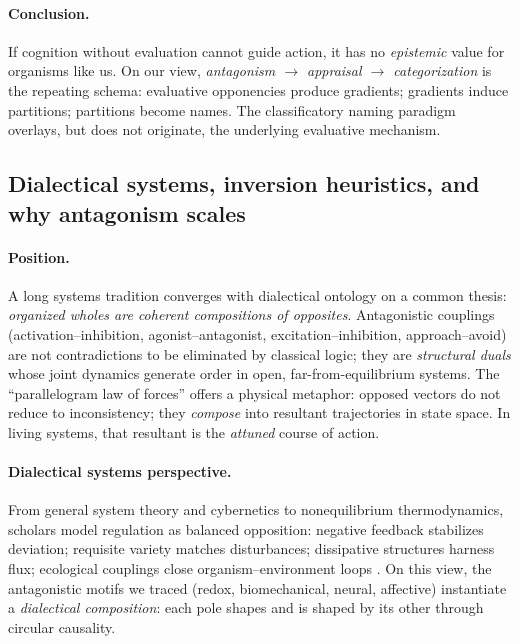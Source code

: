 \paragraph{Conclusion.}
If cognition without evaluation cannot guide action, it has no \emph{epistemic} value for organisms like us. On our view, \emph{antagonism $\to$ appraisal $\to$ categorization} is the repeating schema: evaluative opponencies produce gradients; gradients induce partitions; partitions become names. The classificatory naming paradigm overlays, but does not originate, the underlying evaluative mechanism.

\subsection{Dialectical systems, inversion heuristics, and why antagonism scales}
\label{subsec:dialectical_inversion}

\paragraph{Position.}
A long systems tradition converges with dialectical ontology on a common thesis: \emph{organized wholes are coherent compositions of opposites}. Antagonistic couplings (activation--inhibition, agonist--antagonist, excitation--inhibition, approach--avoid) are not contradictions to be eliminated by classical logic; they are \emph{structural duals} whose joint dynamics generate order in open, far-from-equilibrium systems. The “parallelogram law of forces” offers a physical metaphor: opposed vectors do not reduce to inconsistency; they \emph{compose} into resultant trajectories in state space. In living systems, that resultant is the \emph{attuned} course of action.

\paragraph{Dialectical systems perspective.}
From general system theory and cybernetics to nonequilibrium thermodynamics, scholars model regulation as balanced opposition: negative feedback stabilizes deviation; requisite variety matches disturbances; dissipative structures harness flux; ecological couplings close organism--environment loops \citep{vonBertalanffy1968_GST,Ashby1956_Cybernetics,PrigogineStengers1984_OrderChaos,Bateson1979_MindNature,LevinsLewontin1985_DialecticalBiologist}. On this view, the antagonistic motifs we traced (redox, biomechanical, neural, affective) instantiate a \emph{dialectical composition}: each pole shapes and is shaped by its other through circular causality.

